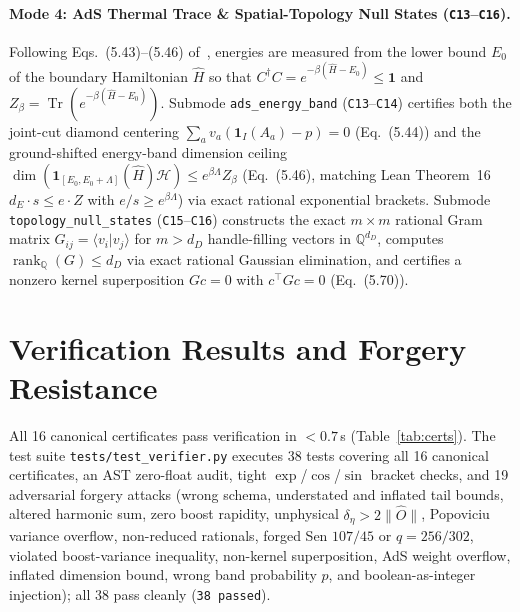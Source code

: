 \documentclass[10pt,twocolumn]{article}
\begin{document}
\paragraph{Mode 4: AdS Thermal Trace \& Spatial-Topology Null States (\texttt{C13}--\texttt{C16}).}
Following Eqs.~(5.43)--(5.46) of~\cite{Chandrasekaran2026}, energies are measured from the lower bound $E_0$ of the boundary Hamiltonian $\hat{H}$ so that $C^\dagger C = e^{-\beta(\hat{H}-E_0)} \leq \mathbf{1}$ and $Z_\beta = \operatorname{Tr}(e^{-\beta(\hat{H}-E_0)})$. Submode \texttt{ads\_energy\_band} (\texttt{C13}--\texttt{C14}) certifies both the joint-cut diamond centering $\sum_a v_a (\mathbf{1}_I(A_a) - p) = 0$ (Eq.~(5.44)) and the ground-shifted energy-band dimension ceiling $\dim(\mathbf{1}_{[E_0, E_0+\Lambda]}(\hat{H})\mathcal{H}) \leq e^{\beta\Lambda} Z_\beta$ (Eq.~(5.46), matching Lean Theorem~16 $d_E \cdot s \leq e \cdot Z$ with $e/s \geq e^{\beta\Lambda}$) via exact rational exponential brackets. Submode \texttt{topology\_null\_states} (\texttt{C15}--\texttt{C16}) constructs the exact $m \times m$ rational Gram matrix $G_{ij} = \langle v_i | v_j \rangle$ for $m > d_D$ handle-filling vectors in $\mathbb{Q}^{d_D}$, computes $\operatorname{rank}_{\mathbb{Q}}(G) \leq d_D$ via exact rational Gaussian elimination, and certifies a nonzero kernel superposition $Gc = 0$ with $c^\top G c = 0$ (Eq.~(5.70)).

\section{Verification Results and Forgery Resistance}
All 16 canonical certificates pass verification in $<0.7$\,s (Table~\ref{tab:certs}). The test suite \texttt{tests/test\_verifier.py} executes 38 tests covering all 16 canonical certificates, an AST zero-float audit, tight $\exp$/$\cos$/$\sin$ bracket checks, and 19 adversarial forgery attacks (wrong schema, understated and inflated tail bounds, altered harmonic sum, zero boost rapidity, unphysical $\delta_\eta > 2\|\hat{O}\|$, Popoviciu variance overflow, non-reduced rationals, forged Sen $107/45$ or $q = 256/302$, violated boost-variance inequality, non-kernel superposition, AdS weight overflow, inflated dimension bound, wrong band probability $p$, and boolean-as-integer injection); all 38 pass cleanly (\texttt{38 passed}).
\end{document}
